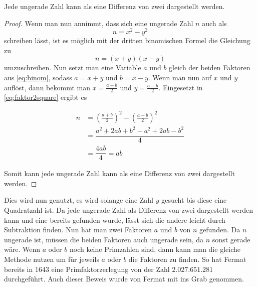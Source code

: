         \begin{theorem}
            Jede ungerade Zahl kann als eine Differenz von zwei  dargestellt werden.
        \end{theorem}
        \begin{proof}
            Wenn man nun annimmt, dass sich eine ungerade Zahl $n$ auch als \begin{equation} \label{eq:faktor2square}
                n = x^2 - y^2
            \end{equation}
            schreiben lässt, ist es möglich mit der dritten binomischen Formel die Gleichung zu
            \begin{equation} \label{eq:binom}
                n = (x+y)(x-y)
            \end{equation}
            umzuschreiben. Nun setzt man eine Variable $a$ und $b$ gleich der beiden Faktoren aus \eqref{eq:binom}, sodass $a = x + y$ und $b = x - y$. Wenn man nun auf $x$ und $y$ auflöst, dann bekommt man $x = \frac{a+b}{2}$ und $y = \frac{a-b}{2}$. Eingesetzt in \eqref{eq:faktor2square} ergibt es
            
            \begin{align*}
                n &= \left( \frac{a+b}{2} \right)^2 - \left( \frac{a-b}{2} \right)^2 \\
                  &= \dfrac{a^2 + 2ab + b^2 - a^2 + 2ab - b^2}{4} \\
                  &= \dfrac{4ab}{4} = ab
            \end{align*}
            
            Somit kann jede ungerade Zahl kann als eine Differenz von zwei  dargestellt werden.
            
        \end{proof}
        
        Dies wird nun genutzt, es wird solange eine Zahl $y$ gesucht bis diese eine \Gls{Quadratzahl} ist. Da jede ungerade Zahl als Differenz von zwei  dargestellt werden kann und eine bereits gefunden wurde, lässt sich die andere leicht durch Subtraktion finden. Nun hat man zwei Faktoren $a$ und $b$ von $n$ gefunden. Da $n$ ungerade ist, müssen die beiden Faktoren auch ungerade sein, da $n$ sonst gerade wäre. Wenn $a$ oder $b$ noch keine Primzahlen sind, dann kann man die gleiche Methode nutzen um für jeweils $a$ oder $b$ die Faktoren zu finden. So hat Fermat bereits in 1643 eine Primfaktorzerlegung von der Zahl $2.027.651.281$ durchgeführt. Auch dieser Beweis wurde von Fermat mit ins Grab genommen.

